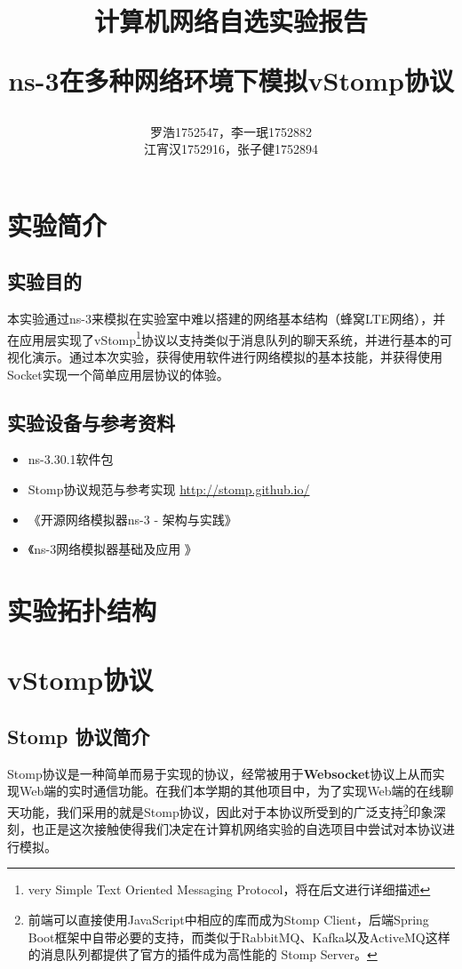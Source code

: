 \documentclass{ctexrep}
\title{\textbf{计算机网络自选实验报告} \\ [2ex] \begin{large} ns-3在多种网络环境下模拟vStomp协议 \end{large} }
\author{罗浩1752547，李一珉1752882\\江宵汉1752916，张子健1752894}
\date{}
\begin{document}
	\maketitle
	\tableofcontents
	
	\chapter{实验简介}
	\section{实验目的}
	本实验通过ns-3来模拟在实验室中难以搭建的网络基本结构（蜂窝LTE网络），并在应用层实现了vStomp\footnote{very Simple Text Oriented Messaging Protocol，将在后文进行详细描述}协议以支持类似于消息队列的聊天系统，并进行基本的可视化演示。通过本次实验，获得使用软件进行网络模拟的基本技能，并获得使用Socket实现一个简单应用层协议的体验。
	\section{实验设备与参考资料}
	\begin{itemize}
		\item ns-3.30.1软件包
		\item Stomp协议规范与参考实现 \url{http://stomp.github.io/}
		\item 《开源网络模拟器ns-3 - 架构与实践》
		\item 《ns-3网络模拟器基础及应用 》
	\end{itemize}
	\chapter{实验拓扑结构}
	
	\chapter{vStomp协议}
	\section{Stomp 协议简介}
	Stomp协议是一种简单而易于实现的协议，经常被用于\textbf{Websocket}协议上从而实现Web端的实时通信功能。在我们本学期的其他项目中，为了实现Web端的在线聊天功能，我们采用的就是Stomp协议，因此对于本协议所受到的广泛支持\footnote{前端可以直接使用JavaScript中相应的库而成为Stomp Client，后端Spring Boot框架中自带必要的支持，而类似于RabbitMQ、Kafka以及ActiveMQ这样的消息队列都提供了官方的插件成为高性能的 Stomp Server。}印象深刻，也正是这次接触使得我们决定在计算机网络实验的自选项目中尝试对本协议进行模拟。
	
\end{document}
